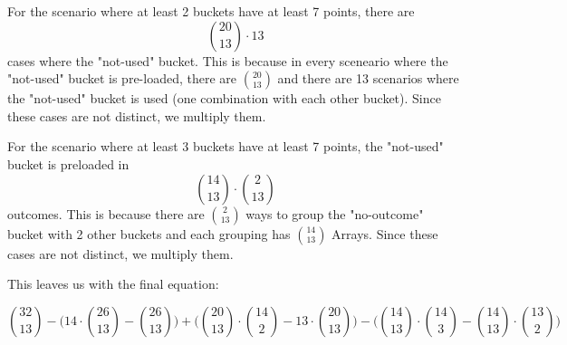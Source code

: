 \documentclass{article}
\begin{document}
For the scenario where at least 2 buckets have at least 7 points, there are  
$$\binom{20}{13} \cdot 13$$  
cases where the "not-used" bucket. This is because in every sceneario where the "not-used" bucket is pre-loaded, there are $\binom{20}{13}$ and there are 13 scenarios where the "not-used" bucket is used (one combination with each other bucket). Since these cases are not distinct, we multiply them.

For the scenario where at least 3 buckets have at least 7 points, the "not-used" bucket is preloaded in  
$$\binom{14}{13} \cdot \binom{2}{13}$$  
outcomes. This is because there are $\binom{2}{13}$ ways to group the "no-outcome" bucket with 2 other buckets and each grouping has $\binom{14}{13}$ Arrays. Since these cases are not distinct, we multiply them.

This leaves us with the final equation:

$$
\binom{32}{13} - \big(14 \cdot \binom{26}{13} - \binom{26}{13}\big) 
+ \big(\binom{20}{13} \cdot \binom{14}{2} - 13 \cdot \binom{20}{13}\big) 
- \big(\binom{14}{13} \cdot \binom{14}{3} - \binom{14}{13} \cdot \binom{13}{2}\big)
$$
\end{document}
